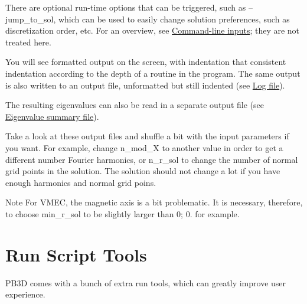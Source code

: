 There are optional run-\/time options that can be triggered, such as {\ttfamily --jump\+\_\+to\+\_\+sol}, which can be used to easily change solution preferences, such as discretization order, etc. For an overview, see \hyperlink{page_inputs_inputs_POST_cmd}{Command-\/line inputs}; they are not treated here.

You will see formatted output on the screen, with indentation that consistent indentation according to the depth of a routine in the program. The same output is also written to an output file, unformatted but still indented (see \hyperlink{page_outputs_output_file_log}{Log file}).

The resulting eigenvalues can also be read in a separate output file (see \hyperlink{page_outputs_output_file_EV}{Eigenvalue summary file}).

Take a look at these output files and shuffle a bit with the input parameters if you want. For example, change {\ttfamily n\+\_\+mod\+\_\+X} to another value in order to get a different number Fourier harmonics, or {\ttfamily n\+\_\+r\+\_\+sol} to change the number of normal grid points in the solution. The solution should not change a lot if you have enough harmonics and normal grid poins.

\begin{DoxyNote}{Note}
For V\+M\+EC, the magnetic axis is a bit problematic. It is necessary, therefore, to choose {\ttfamily min\+\_\+r\+\_\+sol} to be slightly larger than 0; 0. for example.
\end{DoxyNote}
\hypertarget{page_tutorial_tutorial_scripts}{}\section{Run Script Tools}\label{page_tutorial_tutorial_scripts}
P\+B3D comes with a bunch of extra run tools, which can greatly improve user experience.

